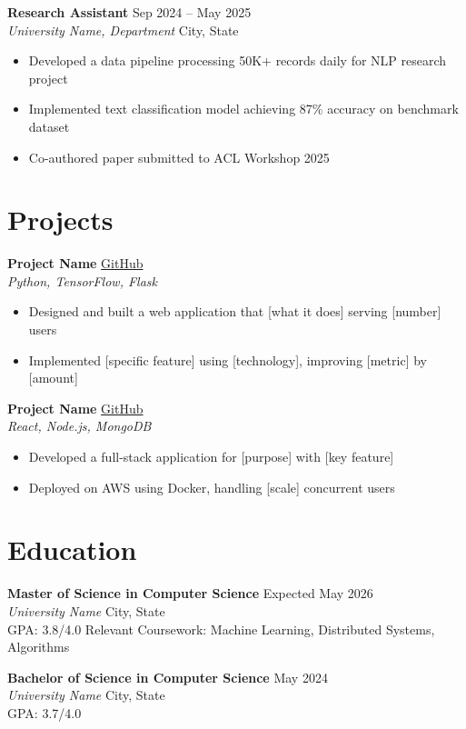 \documentclass[11pt,letterpaper]{article}
\begin{document}
\textbf{Research Assistant} \hfill Sep 2024 -- May 2025 \\
\textit{University Name, Department} \hfill City, State
\begin{itemize}
    \item Developed a data pipeline processing 50K+ records daily for NLP research project
    \item Implemented text classification model achieving 87\% accuracy on benchmark dataset
    \item Co-authored paper submitted to ACL Workshop 2025
\end{itemize}

\section{Projects}

\textbf{Project Name} \hfill \href{https://github.com/yourusername/project}{GitHub} \\
\textit{Python, TensorFlow, Flask}
\begin{itemize}
    \item Designed and built a web application that [what it does] serving [number] users
    \item Implemented [specific feature] using [technology], improving [metric] by [amount]
\end{itemize}

\textbf{Project Name} \hfill \href{https://github.com/yourusername/project}{GitHub} \\
\textit{React, Node.js, MongoDB}
\begin{itemize}
    \item Developed a full-stack application for [purpose] with [key feature]
    \item Deployed on AWS using Docker, handling [scale] concurrent users
\end{itemize}

\section{Education}

\textbf{Master of Science in Computer Science} \hfill Expected May 2026 \\
\textit{University Name} \hfill City, State \\
GPA: 3.8/4.0 \quad Relevant Coursework: Machine Learning, Distributed Systems, Algorithms

\textbf{Bachelor of Science in Computer Science} \hfill May 2024 \\
\textit{University Name} \hfill City, State \\
GPA: 3.7/4.0
\end{document}
